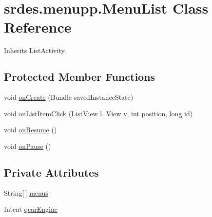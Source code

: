 \hypertarget{classsrdes_1_1menupp_1_1_menu_list}{\section{srdes.\-menupp.\-Menu\-List \-Class \-Reference}
\label{classsrdes_1_1menupp_1_1_menu_list}
}


\-Inherits \-List\-Activity.

\subsection*{\-Protected \-Member \-Functions}
\begin{DoxyCompactItemize}
\item 
void \hyperlink{classsrdes_1_1menupp_1_1_menu_list_ad331a240156d62c884ee81b617e4dc82}{on\-Create} (\-Bundle saved\-Instance\-State)
\item 
void \hyperlink{classsrdes_1_1menupp_1_1_menu_list_a30fb5abff91ef164c444924e7b85a285}{on\-List\-Item\-Click} (\-List\-View l, \-View v, int position, long id)
\item 
void \hyperlink{classsrdes_1_1menupp_1_1_menu_list_a2f8c78eeefd82f582f508622a6fb3e02}{on\-Resume} ()
\item 
void \hyperlink{classsrdes_1_1menupp_1_1_menu_list_a939467177fb7081dcb9c7c241d34237a}{on\-Pause} ()
\end{DoxyCompactItemize}
\subsection*{\-Private \-Attributes}
\begin{DoxyCompactItemize}
\item 
\-String\mbox{[}$\,$\mbox{]} \hyperlink{classsrdes_1_1menupp_1_1_menu_list_a935f4178ad0066a69fe88498eedf3c59}{menus}
\item 
\-Intent \hyperlink{classsrdes_1_1menupp_1_1_menu_list_a3e45ae6fad51d8d0ac45afefe191a0ae}{qcar\-Engine}
\end{DoxyCompactItemize}


